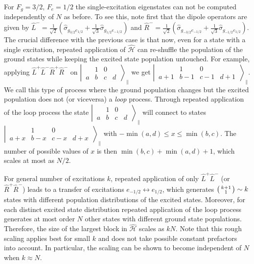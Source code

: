\documentclass[aps,prx,superscriptaddress,twocolumn,notitlepage,nofootinbib,longbibliography]{revtex4-2}
\begin{document}
For $F_g=3/2$, $F_e=1/2$ the single-excitation eigenstates can not be computed independently of $N$ as before. To see this, note first that the dipole operators are given by $\hat{L}^-=\frac{1}{\sqrt{2}} ( \hat{\sigma}_{g_{3/2}e_{1/2}} + \frac{1}{\sqrt{3}} \hat{\sigma}_{g_{1/2}e_{-1/2}} )$ and $\hat{R}^-=\frac{1}{\sqrt{2}} ( \hat{\sigma}_{g_{-3/2}e_{-1/2}} + \frac{1}{\sqrt{3}} \hat{\sigma}_{g_{-1/2}e_{1/2}} )$.
The crucial difference with the previous case is that now, even for a state with a single excitation, repeated application of $\hat{\mathcal{H}}$ can re-shuffle the population of the ground states while keeping the excited state population untouched.
For example, applying $\hat{L}^+\hat{L}^-\hat{R}^+\hat{R}^-$ on $\left|\, \begin{smallmatrix} & 1 & 0 &  \\  a & b & c & d  \end{smallmatrix} \,\right\rangle_\parallel$ we get $\left|\, \begin{smallmatrix} & 1 & 0 &  \\  a+1 & b-1 & c-1 & d+1  \end{smallmatrix} \,\right\rangle_\parallel$. We call this type of process where the ground population changes but the excited population does not (or viceversa) a \emph{loop} process.
Through repeated application of the loop process the state $\left|\, \begin{smallmatrix} & 1 & 0 &  \\  a & b & c & d  \end{smallmatrix} \,\right\rangle_\parallel$ will connect to states $\left|\, \begin{smallmatrix} & 1 & 0 &  \\  a+x & b-x & c-x & d+x  \end{smallmatrix} \,\right\rangle_\parallel$ with $-\min(a,d)\leq x\leq \min(b,c)$. The number of possible values of $x$ is then $\min(b,c)+\min(a,d)+1$, which scales at most as $N/2$.


For general number of excitations $k$, repeated application of only $\hat{L}^+\hat{L}^-$ (or $\hat{R}^+\hat{R}^-$) leads to a transfer of excitations $e_{-1/2}\leftrightarrow e_{1/2}$, which generates $\begin{psmallmatrix} k+1 \\ 1 \end{psmallmatrix}\sim k$ states with different population distributions of the excited states.
Moreover, for each distinct excited state distribution repeated application of the loop process generates at most order $N$ other states with different ground state populations. Therefore, the size of the largest block in $\hat{\mathcal{H}}$ scales as $kN$. Note that this rough scaling applies best for small $k$ and does not take possible constant prefactors into account. In particular, the scaling can be shown to become independent of $N$ when $k\approx N$.
\end{document}
